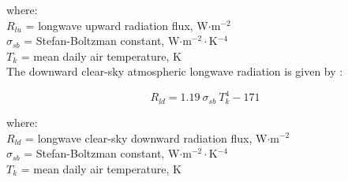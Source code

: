 \noindent where: \\
\indent $R_{lu}$ = longwave upward radiation flux, W$\cdot$m$^{-2}$\\
\indent $\sigma_{sb}$ = Stefan-Boltzman constant, W$\cdot$m$^{-2}\cdot$K$^{-4}$\\
\indent $T_k$ = mean daily air temperature, K\\

\noindent The downward clear-sky atmospheric longwave radiation is given by \parencite[Eq. 20]{linacre68}:

\begin{equation}
\label{eq:rld}
	R_{ld} = 1.19\:\sigma_{sb}\: T_k^4 - 171
\end{equation}

\noindent where: \\
\indent $R_{ld}$ = longwave clear-sky downward radiation flux, W$\cdot$m$^{-2}$\\
\indent $\sigma_{sb}$ = Stefan-Boltzman constant, W$\cdot$m$^{-2}\cdot$K$^{-4}$\\
\indent $T_k$ = mean daily air temperature, K\\

